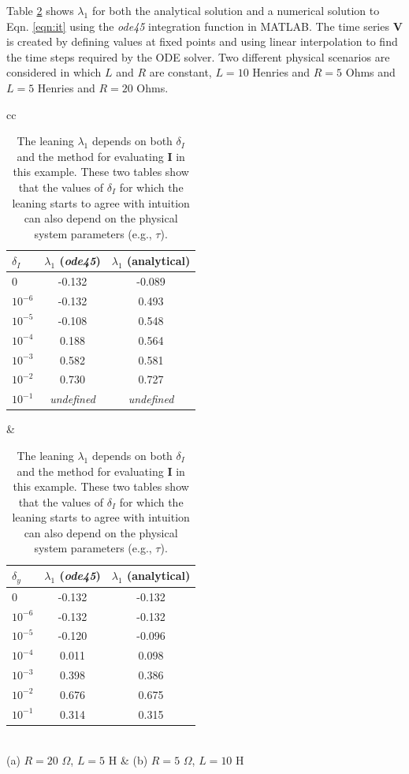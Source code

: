 \documentclass[twocolumn,aps,pre,groupedaddress]{revtex4-1}
\begin{document}
Table \ref{tab:rl} shows $\lambda_1$ for both the analytical solution and a numerical solution to Eqn. \ref{eqn:it} using the {\em ode45} integration function in MATLAB.  The time series $\mathbf{V}$ is created by defining values at fixed points and using linear interpolation to find the time steps required by the ODE solver.  Two different physical scenarios are considered in which $L$ and $R$ are constant, $L=10$ Henries and $R=5$ Ohms and $L=5$ Henries and $R=20$ Ohms.  
\begin{table}
\begin{tabular}{cc}
\begin{tabular}{lcc}
$\delta_I$ & $\lambda_1$ ({\em ode45}) & $\lambda_1$ (analytical)\\
\hline
0 & -0.132 & -0.089 \\
$10^{-6}$ & -0.132 & 0.493 \\
$10^{-5}$ & -0.108 & 0.548 \\
$10^{-4}$ & 0.188 & 0.564 \\
$10^{-3}$ & 0.582 & 0.581 \\ 
$10^{-2}$ & 0.730 & 0.727 \\
$10^{-1}$ & {\em undefined} & {\em undefined}\\
\end{tabular} &
\begin{tabular}{lcc}
$\delta_y$ & $\lambda_1$ ({\em ode45}) & $\lambda_1$ (analytical)\\
\hline
0 & -0.132 & -0.132 \\
$10^{-6}$ & -0.132 & -0.132 \\
$10^{-5}$ & -0.120 & -0.096 \\
$10^{-4}$ & 0.011 & 0.098 \\
$10^{-3}$ & 0.398 & 0.386 \\
$10^{-2}$ & 0.676 & 0.675 \\
$10^{-1}$ & 0.314 & 0.315 \\
\end{tabular} \\
(a) $R = 20$ $\Omega$, $L = 5$ H & (b) $R = 5$ $\Omega$, $L = 10$ H\\
\end{tabular}
\caption{The leaning $\lambda_1$ depends on both $\delta_I$ and the method for evaluating $\mathbf{I}$ in this example.  These two tables show that the values of $\delta_I$ for which the leaning starts to agree with intuition can also depend on the physical system parameters (e.g., $\tau$).}
\label{tab:rl}
\end{table}
\end{document}
